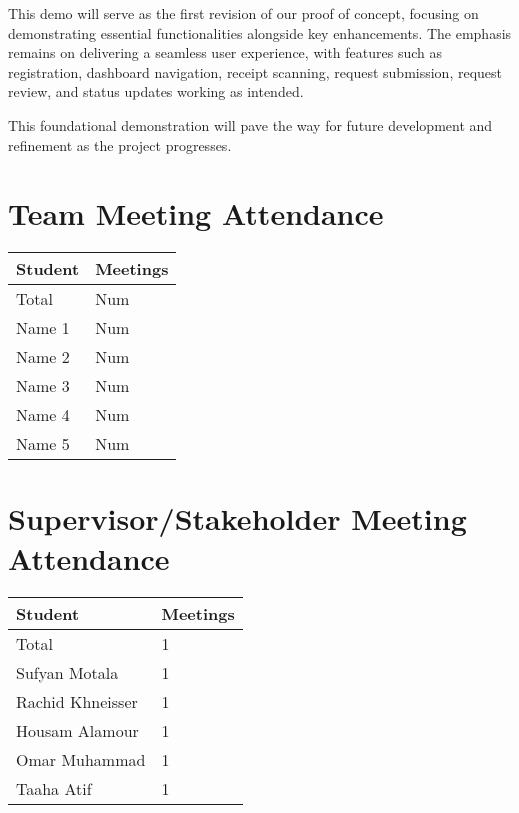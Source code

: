 \documentclass{article}
\begin{document}
This demo will serve as the first revision of our proof of concept, focusing on demonstrating essential functionalities alongside key enhancements. The emphasis remains on delivering a seamless user experience, with features such as registration, dashboard navigation, receipt scanning, request submission, request review, and status updates working as intended. 

This foundational demonstration will pave the way for future development and refinement as the project progresses.


\section{Team Meeting Attendance}


\begin{table}[H]
\centering
\begin{tabular}{ll}
\toprule
\textbf{Student} & \textbf{Meetings}\\
\midrule
Total & Num\\
Name 1 & Num\\
Name 2 & Num\\
Name 3 & Num\\
Name 4 & Num\\
Name 5 & Num\\
\bottomrule
\end{tabular}
\end{table}


\section{Supervisor/Stakeholder Meeting Attendance}

\begin{table}[H]
\centering
\begin{tabular}{ll}
\toprule
\textbf{Student} & \textbf{Meetings}\\
\midrule
Total & 1\\
Sufyan Motala & 1\\
Rachid Khneisser & 1\\
Housam Alamour & 1\\
Omar Muhammad & 1\\
Taaha Atif & 1\\
\bottomrule
\end{tabular}
\end{table}
\end{document}
